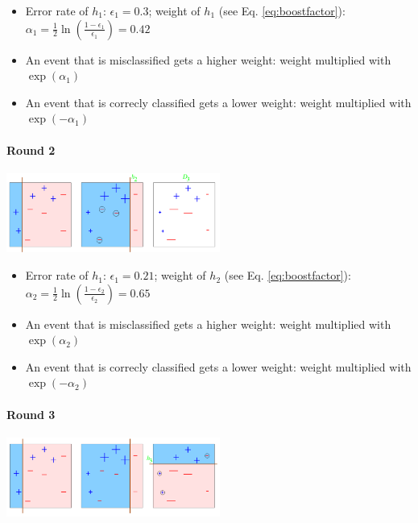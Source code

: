\begin{appendices}
\begin{itemize}
\item Error rate of $h_1$: $\epsilon_1 = 0.3$; weight of $h_1$ (see Eq. \ref{eq:boostfactor}): $\alpha_1 = \frac{1}{2} \ln\left(\frac{1-\epsilon_1}{\epsilon_1}\right) = 0.42$
\item An event that is misclassified gets a higher weight: weight multiplied with $\exp(\alpha_1)$
\item An event that is correcly classified gets a lower weight: weight multiplied with $\exp(-\alpha_1)$
\end{itemize}

\paragraph{Round 2}

\begin{center}
\includegraphics[width=7cm]{appendix/img/adaboost3.png}
\end{center}

\begin{itemize}
\item Error rate of $h_1$: $\epsilon_1 = 0.21$; weight of $h_2$ (see Eq. \ref{eq:boostfactor}): $\alpha_2 = \frac{1}{2} \ln\left(\frac{1-\epsilon_2}{\epsilon_2}\right) = 0.65$
\item An event that is misclassified gets a higher weight: weight multiplied with $\exp(\alpha_2)$
\item An event that is correcly classified gets a lower weight: weight multiplied with $\exp(-\alpha_2)$
\end{itemize}

\paragraph{Round 3}

\begin{center}
\includegraphics[width=7cm]{appendix/img/adaboost4.png}
\end{center}


\end{appendices}
